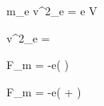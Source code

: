 
\large {} m_{e} v^{2}_{e} = e V 


\large v^{2}_{e} = 


\large \lvert F_{m} \rvert = \lvert -e( \times {}) \rvert 


\large \lvert F_{m} \rvert = \lvert -e( +  \times {}) \rvert 

